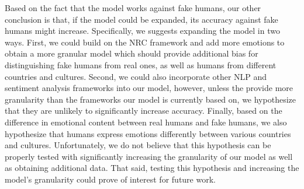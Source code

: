 \documentclass{article}[12pt]
\numberwithin{equation}{subsection}
\begin{document}
\begin{flushleft}
Based on the fact that the model works against fake humans, our other conclusion is that, if the model could be expanded, its accuracy against fake humans might increase.  Specifically, we suggests expanding the model in two ways.  First, we could build on the NRC framework and add more emotions to obtain a more granular model which should provide additional bias for distinguishing fake humans from real ones, as well as humans from different countries and cultures.  Second, we could also incorporate other NLP and sentiment analysis frameworks into our model, however, unless the provide more granularity than the frameworks our model is currently based on, we hypothesize that they are unlikely to significantly increase accuracy.  Finally, based on the difference in emotional content between real humans and fake humans, we also hypothesize that humans express emotions differently between various countries and cultures.  Unfortunately, we do not believe that this hypothesis can be properly tested with significantly increasing the granularity of our model as well as obtaining additional data.  That said, testing this hypothesis and increasing the model's granularity could prove of interest for future work.





















































\end{flushleft}
\end{document}
